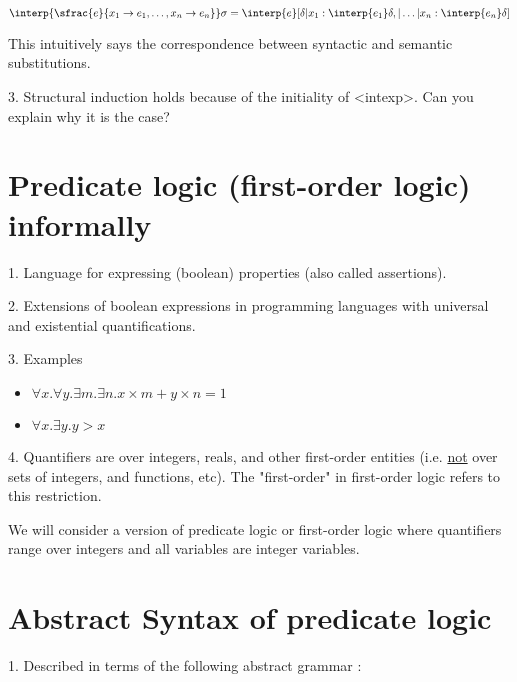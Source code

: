 \documentclass{report}[12pt]
\begin{document}
\begin{corollary}
    $\interp{ \sfrac{e}{x_1 \rightarrow e_1, \ldots, x_n \rightarrow e_n} } \sigma = \interp{ e } [\delta | x_1 : \interp{ e_1 } \delta, | \ldots | x_n : \interp{ e_n } \delta]$
\end{corollary}
This intuitively says the correspondence between syntactic and semantic substitutions.

3. Structural induction holds because of the initiality of <intexp>. Can you explain why it is the case?
\section{Predicate logic (first-order logic) informally}
1. Language for expressing (boolean) properties (also called assertions).

2. Extensions of boolean expressions in programming languages with universal and existential quantifications.

3. Examples
\begin{itemize}
    \item $\forall x. \forall y. \exists m. \exists n. x \times m + y \times n = 1$
    \item $\forall x. \exists y. y > x$
\end{itemize}
4. Quantifiers are over integers, reals, and other first-order entities (i.e. \underline{not} over sets of integers, and functions, etc). The "first-order" in first-order logic refers to this restriction.

We will consider a version of predicate logic or first-order logic where quantifiers range over integers and all variables are integer variables.
\section{Abstract Syntax of predicate logic}
1. Described in terms of the following abstract grammar :
\end{document}

